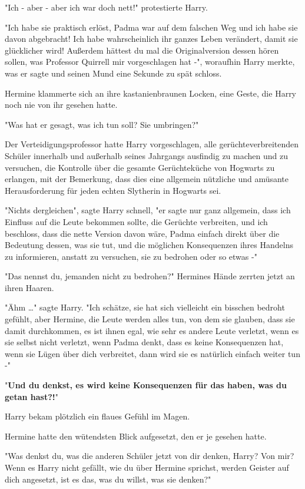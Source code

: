 {"Ich - aber - aber ich war doch nett!" protestierte Harry.

"Ich habe sie praktisch erlöst, Padma war auf dem falschen Weg und ich habe sie davon abgebracht! Ich habe wahrscheinlich ihr ganzes Leben verändert, damit sie glücklicher wird! Außerdem hättest du mal die Originalversion dessen hören sollen, was Professor Quirrell mir vorgeschlagen hat -", woraufhin Harry merkte, was er sagte und seinen Mund eine Sekunde zu spät schloss.

Hermine klammerte sich an ihre kastanienbraunen Locken, eine Geste, die Harry noch nie von ihr gesehen hatte.

"Was hat er gesagt, was ich tun soll? Sie umbringen?"

Der Verteidigungsprofessor hatte Harry vorgeschlagen, alle gerüchteverbreitenden Schüler innerhalb und außerhalb seines Jahrgangs ausfindig zu machen und zu versuchen, die Kontrolle über die gesamte Gerüchteküche von Hogwarts zu erlangen, mit der Bemerkung, dass dies eine allgemein nützliche und amüsante Herausforderung für jeden echten Slytherin in Hogwarts sei.

"Nichts dergleichen", sagte Harry schnell, "er sagte nur ganz allgemein, dass ich Einfluss auf die Leute bekommen sollte, die Gerüchte verbreiten, und ich beschloss, dass die nette Version davon wäre, Padma einfach direkt über die Bedeutung dessen, was sie tut, und die möglichen Konsequenzen ihres Handelns zu informieren, anstatt zu versuchen, sie zu bedrohen oder so etwas -"

"Das nennst du, jemanden nicht zu bedrohen?" Hermines Hände zerrten jetzt an ihren Haaren.

"Ähm …" sagte Harry. "Ich schätze, sie hat sich vielleicht ein bisschen bedroht gefühlt, aber Hermine, die Leute werden alles tun, von dem sie glauben, dass sie damit durchkommen, es ist ihnen egal, wie sehr es andere Leute verletzt, wenn es sie selbst nicht verletzt, wenn Padma denkt, dass es keine Konsequenzen hat, wenn sie Lügen über dich verbreitet, dann wird sie es natürlich einfach weiter tun -"

"\textbf{Und du denkst, es wird keine Konsequenzen für das haben, was du getan hast?!}"

Harry bekam plötzlich ein flaues Gefühl im Magen.

Hermine hatte den wütendsten Blick aufgesetzt, den er je gesehen hatte.

"Was denkst du, was die anderen Schüler jetzt von dir denken, Harry? Von mir? Wenn es Harry nicht gefällt, wie du über Hermine sprichst, werden Geister auf dich angesetzt, ist es das, was du willst, was sie denken?"

}
